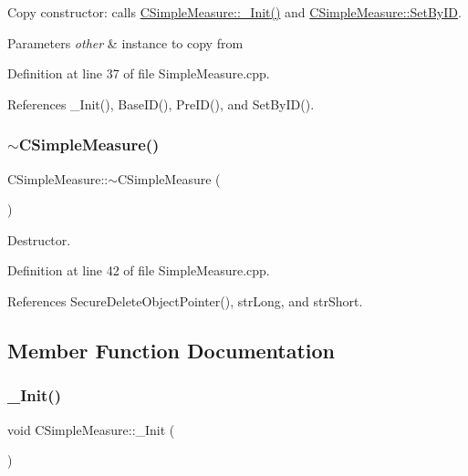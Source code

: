 Copy constructor\+: calls \hyperlink{classCSimpleMeasure_ada8744ac5a824143904a2ecaef2b0b70}{C\+Simple\+Measure\+::\+\_\+\+Init()} and \hyperlink{classCSimpleMeasure_a6945aa333dca5623482d38cd9a7e3225}{C\+Simple\+Measure\+::\+Set\+By\+ID}. 


\begin{DoxyParams}{Parameters}
{\em other} & instance to copy from \\
\hline
\end{DoxyParams}


Definition at line 37 of file Simple\+Measure.\+cpp.



References \+\_\+\+Init(), Base\+I\+D(), Pre\+I\+D(), and Set\+By\+I\+D().

\mbox{\label{classCSimpleMeasure_a6a691614fc884c34c9f6ad36c670587b}} 
\subsubsection{\texorpdfstring{$\sim$\+C\+Simple\+Measure()}{~CSimpleMeasure()}}
{\footnotesize\ttfamily C\+Simple\+Measure\+::$\sim$\+C\+Simple\+Measure (\begin{DoxyParamCaption}{ }\end{DoxyParamCaption})}



Destructor. 



Definition at line 42 of file Simple\+Measure.\+cpp.



References Secure\+Delete\+Object\+Pointer(), str\+Long, and str\+Short.



\subsection{Member Function Documentation}
\mbox{\label{classCSimpleMeasure_ada8744ac5a824143904a2ecaef2b0b70}} 
\subsubsection{\texorpdfstring{\+\_\+\+Init()}{\_Init()}}
{\footnotesize\ttfamily void C\+Simple\+Measure\+::\+\_\+\+Init (\begin{DoxyParamCaption}{ }\end{DoxyParamCaption})\hspace{0.3cm}{\ttfamily [protected]}}



